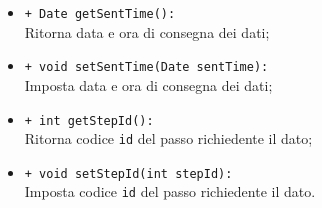 \begin{flushleft}
\begin{itemize}
\begin{sloppypar}
\begin{itemize}
\item \texttt{+ Date getSentTime():}\\ Ritorna data e ora di consegna dei dati;
\item \texttt{+ void setSentTime(Date sentTime):}\\ Imposta data e ora di consegna dei dati;
\item \texttt{+ int getStepId():}\\ Ritorna codice \texttt{id} del passo richiedente il dato;
\item \texttt{+ void setStepId(int stepId):}\\ Imposta codice \texttt{id} del passo richiedente il dato.
\end{itemize}
\end{sloppypar}
\end{itemize}
\end{flushleft}

